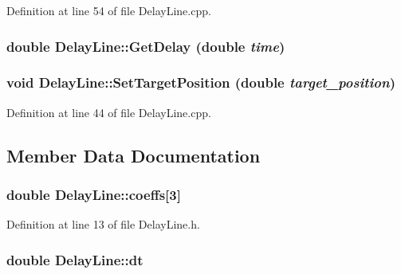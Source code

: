 Definition at line 54 of file DelayLine.cpp.

\hypertarget{classDelayLine_af03fce4b30c09428624fcf27bb6d8476}{
\subsubsection[{GetDelay}]{\setlength{\rightskip}{0pt plus 5cm}double DelayLine::GetDelay (double {\em time})}}
\label{classDelayLine_af03fce4b30c09428624fcf27bb6d8476}
\hypertarget{classDelayLine_aaea9efb6c8a6e791ac75f9bac6c4fe8e}{
\subsubsection[{SetTargetPosition}]{\setlength{\rightskip}{0pt plus 5cm}void DelayLine::SetTargetPosition (double {\em target\_\-position})}}
\label{classDelayLine_aaea9efb6c8a6e791ac75f9bac6c4fe8e}


Definition at line 44 of file DelayLine.cpp.



\subsection{Member Data Documentation}
\hypertarget{classDelayLine_a55d069a045ac765d5783f41a2348fdd4}{
\subsubsection[{coeffs}]{\setlength{\rightskip}{0pt plus 5cm}double {\bf DelayLine::coeffs}\mbox{[}3\mbox{]}}}
\label{classDelayLine_a55d069a045ac765d5783f41a2348fdd4}


Definition at line 13 of file DelayLine.h.

\hypertarget{classDelayLine_a4086dcba3b4835c3a1f2072768e6b8c2}{
\subsubsection[{dt}]{\setlength{\rightskip}{0pt plus 5cm}double {\bf DelayLine::dt}}}
\label{classDelayLine_a4086dcba3b4835c3a1f2072768e6b8c2}


